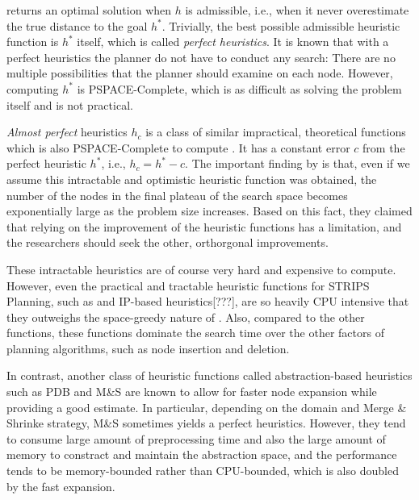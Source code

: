 
\astar returns an optimal solution when $h$ is admissible, i.e., when it
never overestimate the true distance to the goal $h^*$.
Trivially, the best possible admissible heuristic function is $h^*$ itself, which is
called \emph{perfect heuristics}.
It is known that with a perfect heuristics the planner do not have to
conduct any search: There are no multiple possibilities that the
planner should examine on each node.
However, computing $h^*$ is PSPACE-Complete,
which is as difficult as solving the problem itself and is not
practical.

\emph{Almost perfect} heuristics $h_c$ is a class of similar
impractical, theoretical functions which is also PSPACE-Complete to
compute \cite{helmert2008good}.  It has a constant error $c$ from the
perfect heuristic $h^*$, i.e., $h_c=h^*-c$.  The important finding by
\citeauthor{helmert2008good} is that, even if we assume this intractable and
optimistic heuristic function was obtained, the number of the nodes in the final
plateau of the search space becomes exponentially large as the problem size
increases. Based on this fact, they claimed that relying on the
improvement of the heuristic functions has a limitation,
and the researchers should seek the other, orthorgonal improvements.


These intractable heuristics are of course very hard and expensive to
compute. However, even the practical and tractable \sota heuristic
functions for STRIPS Planning, such as \lmcut\cite{Helmert2009} and
IP-based heuristics[???], are so heavily CPU intensive that they
outweighs the space-greedy nature of \astar. Also, compared to the other
functions, these functions dominate the search time over the other
factors of planning algorithms, such as node insertion and deletion.

In contrast, another class of \sota heuristic functions called abstraction-based heuristics
such as PDB \cite{edelkamp2001planning} and M\&S \cite{helmert2007flexible}
are known to allow for faster node expansion while providing a good estimate.
In particular, depending on the domain and Merge \& Shrinke strategy,
M\&S sometimes yields a perfect heuristics.
However, they tend to consume large amount of preprocessing time and also
the large amount of memory to constract and maintain the abstraction
space,
and the performance tends to be memory-bounded rather than CPU-bounded,
which is also doubled by the fast expansion.

